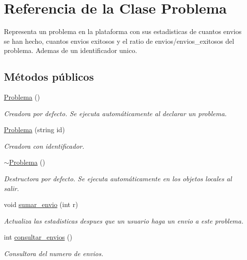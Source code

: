 \hypertarget{class_problema}{}\section{Referencia de la Clase Problema}
\label{class_problema}


Representa un problema en la plataforma con sus estadisticas de cuantos envios se han hecho, cuantos envios exitosos y el ratio de envios/envios\+\_\+exitosos del problema. Ademas de un identificador unico.  


\subsection*{Métodos públicos}
\begin{DoxyCompactItemize}
\item 
\mbox{\hyperlink{class_problema_a9d81af5f3f42a1b4354ad8f3c022fca3}{Problema}} ()
\begin{DoxyCompactList}\small\item\em Creadora por defecto. Se ejecuta automáticamente al declarar un problema. \end{DoxyCompactList}\item 
\mbox{\hyperlink{class_problema_ae114210c654baa6e728c412f7e64cb80}{Problema}} (string id)
\begin{DoxyCompactList}\small\item\em Creadora con identificador. \end{DoxyCompactList}\item 
\mbox{\hyperlink{class_problema_a11dc802ebd9ccb5fbd801e2339c02ae2}{$\sim$\+Problema}} ()
\begin{DoxyCompactList}\small\item\em Destructora por defecto. Se ejecuta automáticamente en los objetos locales al salir. \end{DoxyCompactList}\item 
void \mbox{\hyperlink{class_problema_a418b7c394398c77cd81e5b8a1c218ba2}{sumar\+\_\+envio}} (int r)
\begin{DoxyCompactList}\small\item\em Actualiza las estadisticas despues que un usuario haga un envio a este problema. \end{DoxyCompactList}\item 
int \mbox{\hyperlink{class_problema_a29c94c089b042f3a7cc1fda4739460bd}{consultar\+\_\+envios}} ()
\begin{DoxyCompactList}\small\item\em Consultora del numero de envios. \end{DoxyCompactList}\item 

\end{DoxyCompactItemize}
